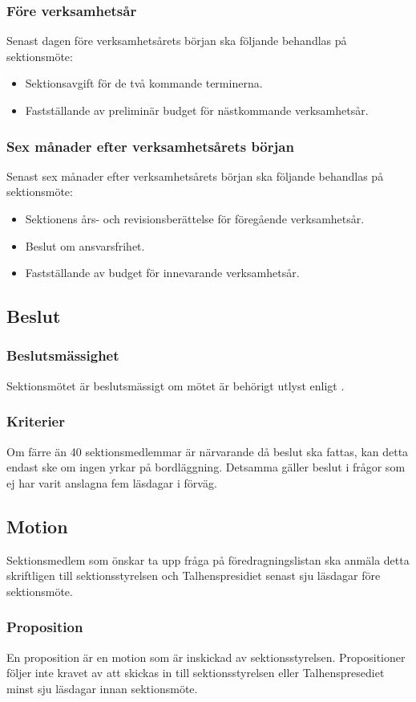 \subsubsection{Före verksamhetsår}
Senast dagen före verksamhetsårets början ska följande behandlas på sektionsmöte:
\begin{itemize}
\item Sektionsavgift för de två kommande terminerna.
\item Fastställande av preliminär budget för nästkommande verksamhetsår.
\end{itemize}
\subsubsection{Sex månader efter verksamhetsårets början}
Senast sex månader efter verksamhetsårets början ska följande behandlas på sektionsmöte:
\begin{itemize}
\item Sektionens års- och revisionsberättelse för föregående verksamhetsår.
\item Beslut om ansvarsfrihet.
\item Fastställande av budget för innevarande verksamhetsår.
\end{itemize}
\subsection{Beslut}
\subsubsection{Beslutsmässighet}
Sektionsmötet är beslutsmässigt om mötet är behörigt utlyst enligt .
\subsubsection{Kriterier}
Om färre än 40 sektionsmedlemmar är närvarande då beslut ska fattas, kan detta endast ske om ingen yrkar på bordläggning. Detsamma gäller beslut i frågor som ej har varit anslagna fem läsdagar i förväg.
\subsection{Motion}
Sektionsmedlem som önskar ta upp fråga på föredragningslistan ska anmäla detta skriftligen till sektionsstyrelsen och Talhenspresidiet senast sju läsdagar före sektionsmöte.
\subsubsection{Proposition}
En proposition är en motion som är inskickad av sektionsstyrelsen.
Propositioner följer inte kravet av att skickas in till sektionsstyrelsen eller Talhenspresediet minst sju läsdagar innan sektionsmöte.
